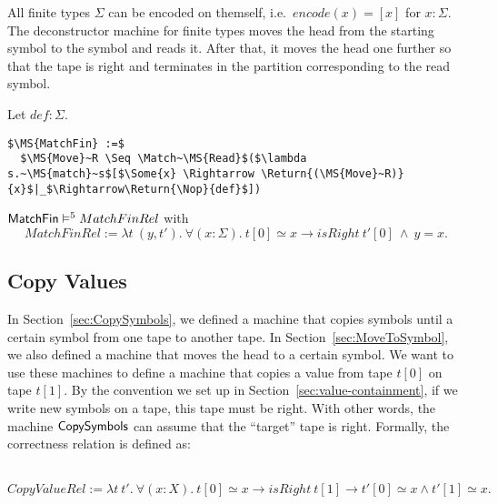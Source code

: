 All finite types $\Sigma$ can be encoded on themself, i.e.\ $encode(x)=[x]$ for $x:\Sigma$.  The deconstructor machine for finite types moves the head
from the starting symbol to the symbol and reads it.  After that, it moves the head one further so that the tape is right and terminates in the
partition corresponding to the read symbol.

%
\begin{definition}[$\MS{MatchFin}$][MatchFin]
  \label{def:MatchFin}
  Let $def:\Sigma$.
  \small
\begin{lstlisting}[style=semicoqstyle]
$\MS{MatchFin} :=$
  $\MS{Move}~R \Seq \Match~\MS{Read}$($\lambda s.~\MS{match}~s$[$\Some{x} \Rightarrow \Return{(\MS{Move}~R)}{x}$|_$\Rightarrow\Return{\Nop}{def}$])
\end{lstlisting}
\end{definition}

\begin{lemma}
  \label{lem:MatchFin_Sem}
  $\mathsf{MatchFin} \mathrel{\vDash^{5}} MatchFinRel$ with
  \[
    MatchFinRel := \lambda t~(y,t').~\forall(x:\Sigma).~t[0] \simeq x \rightarrow isRight~t'[0] ~\land~ y=x.
  \]
\end{lemma}




\subsection{Copy Values}
\label{sec:copy}

In Section~\ref{sec:CopySymbols}, we defined a machine that copies symbols until a certain symbol from one tape to another tape.  In
Section~\ref{sec:MoveToSymbol}, we also defined a machine that moves the head to a certain symbol.  We want to use these machines to define a machine
that copies a value from tape $t[0]$ on tape $t[1]$.  By the convention we set up in Section~\ref{sec:value-containment}, if we write new symbols on a
tape, this tape must be right.  With other words, the machine $\mathsf{CopySymbols}$ can assume that the ``target'' tape is right.  Formally, the
correctness relation is defined as:
%
\begin{definition}
  \label{def:CopyValue_Rel}
  ~
  \[
    CopyValueRel := \lambda t~t'.~\forall (x:X).~t[0] \simeq x \rightarrow isRight~t[1] \rightarrow t'[0] \simeq x \land t'[1] \simeq x.
  \]
\end{definition}

